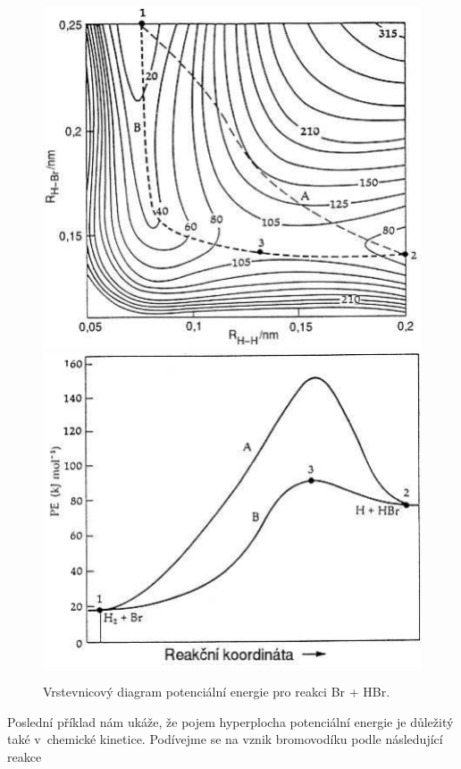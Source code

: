 \begin{figure} [ht]
\centering
\begin{center}\includegraphics[scale=1.0]{obrazky/potsurface1.pdf}\hfill\raise 2mm\hbox{\includegraphics[scale=1.0]{obrazky/potsurface2.pdf}}
\end{center}
\caption[Potenciální energie reakce Br + HBr]{Vrstevnicový diagram potenciální energie pro reakci Br + HBr.}
\label{obr:mol:HBr}
\end{figure}

Poslední příklad nám ukáže, že pojem hyperplocha potenciální energie je důležitý také v~chemické kinetice. Podívejme se na vznik bromovodíku podle následující reakce

